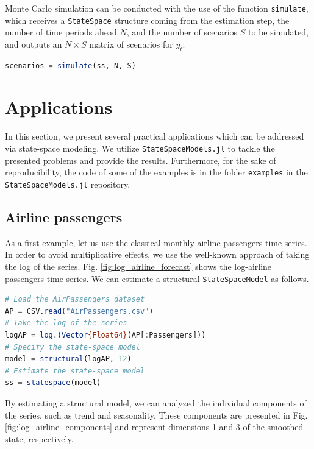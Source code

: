 \documentclass{juliacon}
\begin{document}
Monte Carlo simulation can be conducted with the use of the function \texttt{simulate}, which receives a \texttt{StateSpace} structure coming from the estimation step, the number of time periods ahead $N$, and the number of scenarios $S$ to be simulated, and outputs an $N \times S$ matrix of scenarios for $y_{t}$:
%
\begin{lstlisting}[language = Julia]
scenarios = simulate(ss, N, S)
\end{lstlisting}

\section{Applications} \label{sec:applications}

In this section, we present several practical applications which can be addressed via state-space modeling. We utilize \texttt{StateSpaceModels.jl} to tackle the presented problems and provide the results. Furthermore, for the sake of reproducibility, the code of some of the examples is in the folder \texttt{examples} in the \texttt{StateSpaceModels.jl} repository.

\subsection{Airline passengers}

As a first example, let us use the classical monthly airline passengers time series. In order to avoid multiplicative effects, we use the well-known approach of taking the log of the series. Fig. \ref{fig:log_airline_forecast} shows the log-airline passengers time series. We can estimate a structural \texttt{StateSpaceModel} as follows.
%
\begin{lstlisting}[language = Julia]
# Load the AirPassengers dataset
AP = CSV.read("AirPassengers.csv")
# Take the log of the series
logAP = log.(Vector{Float64}(AP[:Passengers]))
# Specify the state-space model
model = structural(logAP, 12)
# Estimate the state-space model
ss = statespace(model)
\end{lstlisting}

By estimating a structural model, we can analyzed the individual components of the series, such as trend and seasonality. These components are presented in Fig. \ref{fig:log_airline_components} and represent dimensions 1 and 3 of the smoothed state, respectively.
\end{document}
